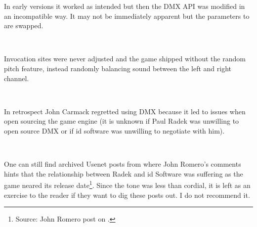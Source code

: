 In early versions it worked as intended but then the DMX API was modified in an incompatible way. It may not be immediately apparent but the parameters to  are swapped.\\
\par
{}\\
\par
 Invocation sites were never adjusted and the game shipped without the random pitch feature, instead randomly balancing sound between the left and right channel.\\
\par
{}\\
\par
In retrospect John Carmack regretted using DMX because it led to issues when open sourcing the game engine (it is unknown if Paul Radek was unwilling to open source DMX or if id software was unwilling to negotiate with him).\\
\par
{}\\
\par
One can still find archived Usenet posts from  where John Romero's comments hints that the relationship between Radek and id Software was suffering as the game neared its release date\footnote{Source: John Romero post on .}. Since the tone was less than cordial, it is left as an exercise to the reader if they want to dig these posts out. I do not recommend it.



